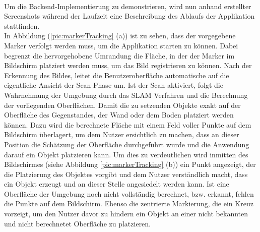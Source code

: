 \pagebreak
\\ 
\linebreak
Um die Backend-Implementierung zu demonstrieren, wird nun anhand erstellter Screenshots während der Laufzeit eine Beschreibung des Ablaufs der Applikation stattfinden.
\\ 
In Abbildung (\ref{pic:markerTracking} (a)) ist zu sehen, dass der vorgegebene Marker verfolgt werden muss, um die Applikation starten zu können. Dabei begrenzt 
die hervorgehobene Umrandung die Fläche, in der der Marker im Bildschirm platziert werden muss, um das Bild registrieren zu können. Nach der Erkennung des Bildes, 
leitet die Benutzeroberfläche automatische auf die eigentliche Ansicht der Scan-Phase um. Ist der Scan aktiviert, folgt die Wahrnehmung der Umgebung durch das 
\acs{SLAM} Verfahren und die Berechnung der vorliegenden Oberflächen. Damit die zu setzenden Objekte exakt auf der Oberfläche des Gegenstandes, der Wand oder dem 
Boden platziert werden können. Dazu wird die berechnete Fläche mit einem Feld voller Punkte auf dem Bildschirm überlagert, um dem Nutzer ersichtlich zu machen, 
dass an dieser Position die Schätzung der Oberfläche durchgeführt wurde und die Anwendung darauf ein Objekt platzieren kann. Um dies zu verdeutlichen wird inmitten 
des Bildschirmes (siehe Abbildung \ref{pic:markerTracking} (b)) ein Punkt angezeigt, der die Platzierung des Objektes vorgibt und dem Nutzer verständlich macht, 
dass ein Objekt erzeugt und an dieser Stelle angesiedelt werden kann. Ist eine Oberfläche der Umgebung noch nicht vollständig berechnet, bzw. erkannt, fehlen 
die Punkte auf dem Bildschirm. Ebenso die zentrierte Markierung, die ein Kreuz vorzeigt, um den Nutzer davor zu hindern ein Objekt an einer nicht bekannten und 
nicht berechnetet Oberfläche zu platzieren.
